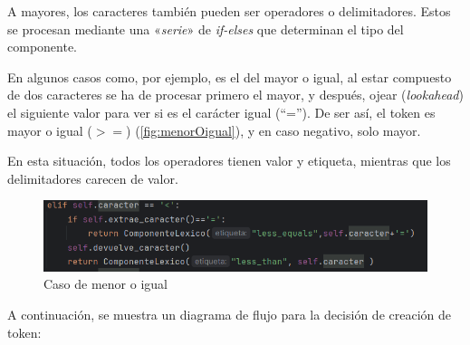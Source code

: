 \documentclass[a4paper,twocolumn]{article}
\begin{document}
    A mayores, los caracteres también pueden ser operadores o delimitadores.
    Estos se procesan mediante una «\textit{serie}» de \textit{if-elses} que determinan el tipo del componente.

    En algunos casos como, por ejemplo, es el del mayor o igual, al estar compuesto de dos caracteres se ha de procesar primero el mayor, y después, ojear (\textit{lookahead}) el siguiente valor para ver si es el carácter igual (``='').
    De ser así, el token es mayor o igual ($>=$) (\autoref{fig:menorOigual}), y en caso negativo, solo mayor.

    En esta situación, todos los operadores tienen valor y etiqueta, mientras que los delimitadores carecen de valor.

    \begin{figure} [ht]
        \centering
        \includegraphics[width=1\linewidth]{imagen}
        \caption{Caso de menor o igual}
        \label{fig:menorOigual}
    \end{figure}



    A continuación, se muestra un diagrama de flujo
    para la decisión de creación de token:
\end{document}
